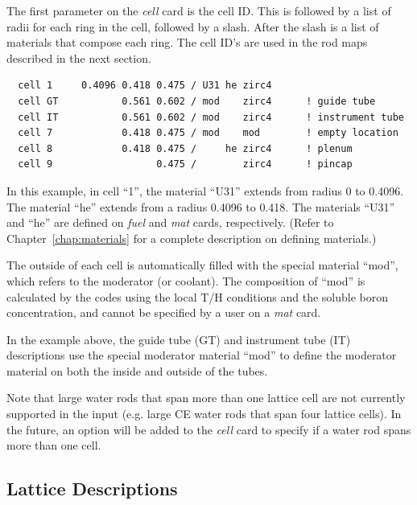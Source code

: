 The first parameter on the {\it cell} card is the cell ID.
This is followed by a list of radii for each ring in the cell, followed by a slash.
After the slash is a list of materials that compose each ring.
The cell ID's are used in the rod maps described in the next section.

\begin{verbatim}
  cell 1     0.4096 0.418 0.475 / U31 he zirc4
  cell GT           0.561 0.602 / mod    zirc4      ! guide tube
  cell IT           0.561 0.602 / mod    zirc4      ! instrument tube
  cell 7            0.418 0.475 / mod    mod        ! empty location
  cell 8            0.418 0.475 /     he zirc4      ! plenum
  cell 9                  0.475 /        zirc4      ! pincap
\end{verbatim}

In this example, in cell ``1'', the material ``U31'' extends from radius 0 to 0.4096.
The material ``he'' extends from a radius 0.4096 to 0.418.
The materials ``U31'' and ``he'' are defined on {\it fuel} and {\it mat} cards, respectively.
(Refer to Chapter~\ref{chap:materials} for a complete description on defining materials.)

The outside of each cell is automatically filled with the special material ``mod'', which
refers to the moderator (or coolant).
The composition of ``mod'' is calculated by the codes using the local T/H conditions and the
soluble boron concentration, and cannot be specified by a user on a {\it mat} card.

In the example above, the guide tube (GT) and instrument tube (IT) descriptions
use the special moderator material ``mod'' to define the moderator material on both
the inside and outside of the tubes.

Note that large water rods that span more than one lattice cell are not currently supported in the input
(e.g. large CE water rods that span four lattice cells).
In the future, an option will be added to the {\it cell} card to specify if a water rod spans more than one cell. 

\subsection{Lattice Descriptions}

